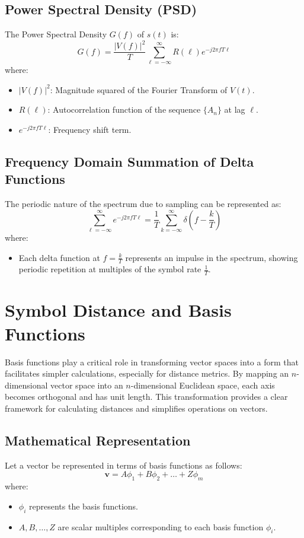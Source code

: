\documentclass[10pt]{article}
\begin{document}
\subsection{Power Spectral Density (PSD)}
The Power Spectral Density \( G(f) \) of \( s(t) \) is:
\[
G(f) = \frac{|V(f)|^2}{T} \sum_{\ell=-\infty}^{\infty} R(\ell) e^{-j 2 \pi f T \ell}
\]
where:
\begin{itemize}
    \item \( |V(f)|^2 \): Magnitude squared of the Fourier Transform of \( V(t) \).
    \item \( R(\ell) \): Autocorrelation function of the sequence \( \{A_n\} \) at lag \( \ell \).
    \item \( e^{-j 2 \pi f T \ell} \): Frequency shift term.
\end{itemize}

\subsection{Frequency Domain Summation of Delta Functions}
The periodic nature of the spectrum due to sampling can be represented as:
\[
\sum_{\ell=-\infty}^{\infty} e^{-j 2 \pi f T \ell} = \frac{1}{T} \sum_{k=-\infty}^{\infty} \delta \left(f - \frac{k}{T}\right)
\]
where:
\begin{itemize}
    \item Each delta function at \( f = \frac{k}{T} \) represents an impulse in the spectrum, showing periodic repetition at multiples of the symbol rate \( \frac{1}{T} \).
\end{itemize}

\section{Symbol Distance and Basis Functions}
Basis functions play a critical role in transforming vector spaces into a form that facilitates simpler calculations, especially for distance metrics. By mapping an $n$-dimensional vector space into an $n$-dimensional Euclidean space, each axis becomes orthogonal and has unit length. This transformation provides a clear framework for calculating distances and simplifies operations on vectors.

\subsection{Mathematical Representation}

Let a vector be represented in terms of basis functions as follows:
\[
\mathbf{v} = A \phi_1 + B \phi_2 + \ldots + Z \phi_m
\]
where:
\begin{itemize}
    \item \( \phi_i \) represents the basis functions.
    \item \( A, B, \ldots, Z \) are scalar multiples corresponding to each basis function \( \phi_i \).
\end{itemize}
\end{document}
